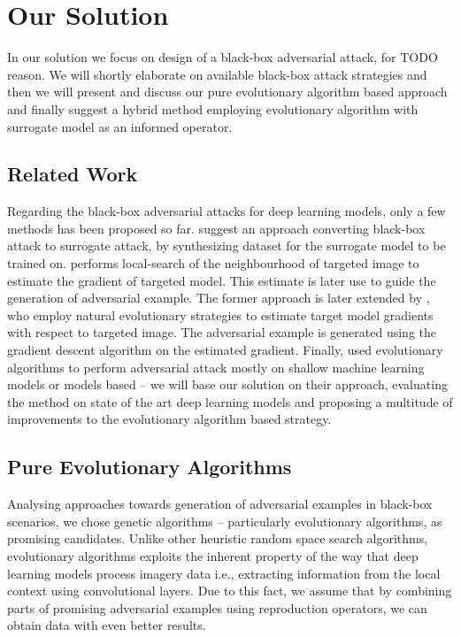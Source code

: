 \chapter{Our Solution}
In our solution we focus on design of a black-box adversarial attack, for TODO reason. We will shortly elaborate on available black-box attack strategies and then we will present and discuss our pure evolutionary algorithm based approach and finally suggest a hybrid method employing evolutionary algorithm with surrogate model as an informed operator.

\section{Related Work}
Regarding the black-box adversarial attacks for deep learning models, only a few methods has been proposed so far. \cite{DBLP:journals/corr/PapernotMGJCS16} suggest an approach converting black-box attack to surrogate attack, by synthesizing dataset for the surrogate model to be trained on. \cite{8014906} performs local-search of the neighbourhood of targeted image to estimate the gradient of targeted model. This estimate is later use to guide the generation of adversarial example. The former approach is later extended by \cite{DBLP:journals/corr/abs-1804-08598}, who employ natural evolutionary strategies to estimate target model gradients with respect to targeted image. The adversarial example is generated using the gradient descent algorithm on the estimated gradient. Finally, \cite{Vidnerova:2016:EGA:2955129.2955178} used evolutionary algorithms to perform adversarial attack mostly on shallow machine learning models or models based -- we will base our solution on their approach, evaluating the method on state of the art deep learning models and proposing a multitude of improvements to the evolutionary algorithm based strategy.

\section{Pure Evolutionary Algorithms}
Analysing approaches towards generation of adversarial examples in black-box scenarios, we chose genetic algorithms -- particularly evolutionary algorithms, as promising candidates. Unlike other heuristic random space search algorithms, evolutionary algorithms exploits the inherent property of the way that deep learning models process imagery data i.e., extracting information from the local context using convolutional layers. Due to this fact, we assume that by combining parts of promising adversarial examples using reproduction operators, we can obtain data with even better results.

